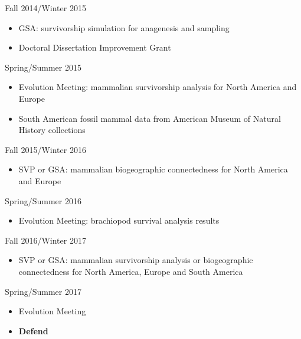 \documentclass[12pt,letterpaper]{article}
\begin{document}
Fall 2014/Winter 2015
\begin{itemize}
  \item GSA: survivorship simulation for anagenesis and sampling
  \item Doctoral Dissertation Improvement Grant
\end{itemize}

Spring/Summer 2015
\begin{itemize}
  \item Evolution Meeting: mammalian survivorship analysis for North America and Europe
  \item South American fossil mammal data from American Museum of Natural History collections
\end{itemize}

Fall 2015/Winter 2016
\begin{itemize}
  \item SVP or GSA: mammalian biogeographic connectedness for North America and Europe
\end{itemize}

Spring/Summer 2016
\begin{itemize}
  \item Evolution Meeting: brachiopod survival analysis results
\end{itemize}

Fall 2016/Winter 2017
\begin{itemize}
  \item SVP or GSA: mammalian survivorship analysis or biogeographic connectedness for North America, Europe and South America
\end{itemize}

Spring/Summer 2017
\begin{itemize}
  \item Evolution Meeting
  \item \textbf{Defend}
\end{itemize}



\clearpage


\end{document}
